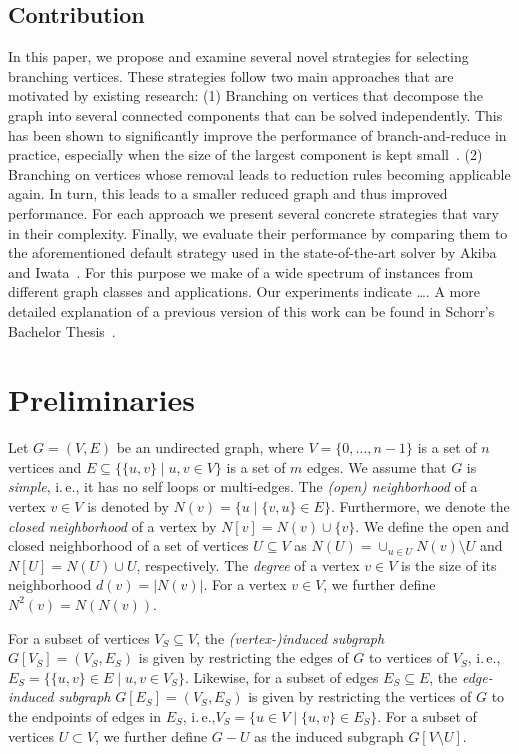 \documentclass[a4paper,UKenglish,cleveref, autoref, thm-restate]{lipics-v2021}
\newcommand{\ie}{i.\,e.,\xspace}
\begin{document}
\subsection{Contribution}
In this paper, we propose and examine several novel strategies for selecting branching vertices.
These strategies follow two main approaches that are motivated by existing research: (1) Branching on vertices that decompose the graph into several connected components that can be solved independently.
This has been shown to significantly improve the performance of branch-and-reduce in practice, especially when the size of the largest component is kept small~\cite{alsahafy2020computing}.
(2) Branching on vertices whose removal leads to reduction rules becoming applicable again.
In turn, this leads to a smaller reduced graph and thus improved performance.
For each approach we present several concrete strategies that vary in their complexity.
Finally, we evaluate their performance by comparing them to the aforementioned default strategy used in the state-of-the-art solver by Akiba and Iwata~\cite{AkibaIwata}.
For this purpose we make of a wide spectrum of instances from different graph classes and applications.
Our experiments indicate \ldots {}.
A more detailed explanation of a previous version of this work
can be found in Schorr's Bachelor Thesis~\cite{schorr2020improved}.

\section{Preliminaries}
Let $G=(V,E)$ be an undirected graph, where $V = \{0, \ldots, n-1\}$ is a set of $n$ vertices and $E \subseteq  \{\{u,v\} \mid u,v \in V\}$ is a set of $m$ edges. 
We assume that $G$ is \emph{simple}, \ie it has no self loops or multi-edges.
The \emph{(open) neighborhood} of a vertex $v \in V$ is denoted by $N(v) = \{u \mid \{v,u\} \in E\}$.
Furthermore, we denote the \emph{closed neighborhood} of a vertex by $N[v]=N(v) \cup \{v\}$.
We define the open and closed neighborhood of a set of vertices $U \subseteq V$
as $N(U) = \cup_{u \in U} N(v) \setminus U$ and $N[U] = N(U) \cup U$, respectively.
The \emph{degree} of a vertex $v \in V$ is the size of its neighborhood $d(v) = |N(v)|$.
For a vertex $v \in V$, we further define $N^2(v) = N(N(v))$.

For a subset of vertices $V_S \subseteq V$, the \emph{(vertex-)induced subgraph}
$G[V_S] = (V_S, E_S)$ is given by restricting the edges of $G$ to vertices of $V_S$, \ie $E_S = \{\{u,v\} \in E \mid u,v \in V_S\}$.
Likewise, for a subset of edges $E_S \subseteq E$, the \emph{edge-induced
  subgraph} $G[E_S] = (V_S, E_S)$ is given by restricting the vertices of $G$ to the endpoints of edges in $E_S$, \ie $V_S = \{u \in V \mid \{u,v\} \in E_S\}$.
  For a subset of vertices $U \subset V$, we further define $G - U$ as the induced subgraph $G[V \setminus U]$.
\end{document}
